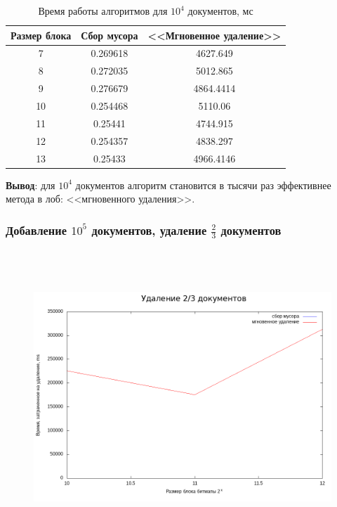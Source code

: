 \begin{table}[H]
      \caption{Время работы алгоритмов для $10^4$ документов, мс}
      \centering
      \small
      \singlespacing
      \begin{tabular}{|c|c|c|}
            \hline
            Размер блока & Сбор мусора                & <<Мгновенное удаление>> \\ \hline \hline
            7            & 0.269618                   & 4627.649                \\ \hline
            8            & 0.272035                   & 5012.865                \\ \hline
            9            & 0.276679                   & 4864.4414               \\ \hline
            10           & 0.254468                   & 5110.06                 \\ \hline
            11           & 0.25441                    & 4744.915                \\ \hline
            12           & 0.254357                   & 4838.297                \\ \hline
            13           & 0.25433                    & 4966.4146               \\ \hline
\end{tabular}
\end{table}

\textbf{Вывод}: для $10^4$ документов алгоритм становится в тысячи раз
эффективнее метода в лоб: <<мгновенного удаления>>.

\subsubsection{Добавление $10^5$ документов, удаление $\frac{2}{3}$ документов}
\begin{figure}[H]
\includegraphics[width=\linewidth, height=11cm]{fig/time_1e5.png}
\end{figure}

